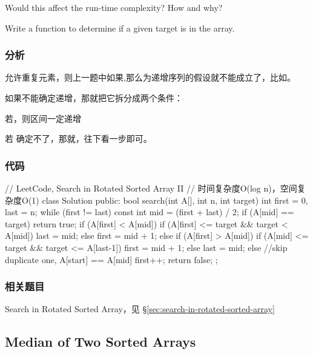 Would this affect the run-time complexity? How and why?

Write a function to determine if a given target is in the array.


\subsubsection{分析}
允许重复元素，则上一题中如果,那么\fn{[l,m]}为递增序列的假设就不能成立了，比如\code{[1,3,1,1,1]}。

如果不能确定递增，那就把它拆分成两个条件：
\begindot
\item 若，则区间\fn{[l,m]}一定递增
\item 若 确定不了，那就，往下看一步即可。
\myenddot

\subsubsection{代码}
\begin{Code}
// LeetCode, Search in Rotated Sorted Array II
// 时间复杂度O(log n)，空间复杂度O(1)
class Solution {
public:
    bool search(int A[], int n, int target) {
        int first = 0, last = n;
        while (first != last) {
            const int mid = (first + last) / 2;
            if (A[mid] == target)
                return true;
            if (A[first] < A[mid]) {
                if (A[first] <= target && target < A[mid])
                    last = mid;
                else
                    first = mid + 1;
            } else if (A[first] > A[mid]) {
                if (A[mid] <= target && target <= A[last-1])
                    first = mid + 1;
                else
                    last = mid;
            } else
                //skip duplicate one, A[start] == A[mid]
                first++;
        }
        return false;
    }
};
\end{Code}


\subsubsection{相关题目}

\begindot
\item Search in Rotated Sorted Array，见 \S \ref{sec:search-in-rotated-sorted-array}
\myenddot


\subsection{Median of Two Sorted Arrays}
\label{sec:median-of-two-sorted-arrays}



